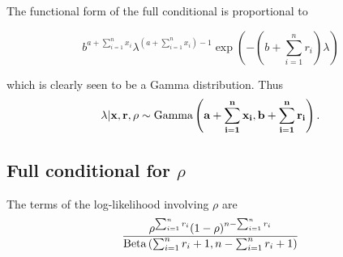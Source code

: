 \documentclass{amsart}
\begin{document}
%
%
%

The functional form of the full conditional is proportional to

$$
b^{a+\sum_{i=1}^n x_i} \lambda^{(a + \sum_{i=1}^n x_i) - 1} \exp{\left(-(b + \sum_{i=1}^n r_i) \lambda \right)}
$$

\noindent which is clearly seen to be a Gamma distribution. Thus
$$
\lambda | \bf x, \bf r, \rho \sim \text{Gamma} \left( a + \sum_{i=1}^n x_i, b + \sum_{i=1}^n r_i \right).
$$

\subsection{Full conditional for $\rho$}
The terms of the log-likelihood involving $\rho$ are
$$
\frac{\rho^{\sum_{i=1}^n r_i} (1 - \rho)^{n - \sum_{i=1}^n r_i}}{\text{Beta} \left( \sum_{i=1}^n r_i + 1, n - \sum_{i=1}^n r_i + 1 \right)}
$$
\end{document}
